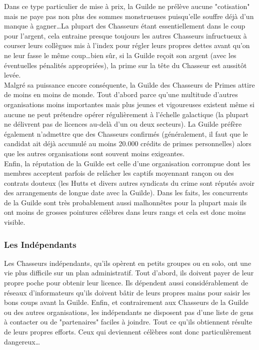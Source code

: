\documentclass[twoside]{article}
\begin{document}
Dans ce type particulier de mise à prix, la Guilde ne prélève aucune "cotisation" mais ne paye pas non plus des sommes monstrueuses puisqu'elle souffre déjà d'un manque à gagner\ldots La plupart des Chasseurs étant essentiellement dans le coup pour l'argent, cela entraine presque toujours les autres Chasseurs infructueux à courser leurs collègues mis à l'index pour régler leurs propres dettes avant qu'on ne leur fasse le même coup\ldots bien sûr, si la Guilde reçoit son argent (avec les éventuelles pénalités appropriées), la prime sur la tête du Chasseur est aussitôt levée.\\

Malgré sa puissance encore conséquente, la Guilde des Chasseurs de Primes attire de moins en moins de monde. Tout d'abord parce qu'une multitude d'autres organisations moins importantes mais plus jeunes et vigoureuses existent même si aucune ne peut prétendre opérer régulièrement à l'échelle galactique (la plupart ne délivrent pas de licences au-delà d'un ou deux secteurs). La Guilde préfère également n'admettre que des Chasseurs confirmés (généralement, il faut que le candidat ait déjà accumulé au moins 20.000 crédits de primes personnelles) alors que les autres organisations sont souvent moins exigeantes.\\

Enfin, la réputation de la Guilde est celle d'une organisation corrompue dont les membres acceptent parfois de relâcher les captifs moyennant rançon ou des contrats douteux (les Hutts et divers autres syndicats du crime sont réputés avoir des arrangements de longue date avec la Guilde). Dans les faits, les concurrents de la Guilde sont très probablement aussi malhonnêtes pour la plupart mais ils ont moins de grosses pointures célèbres dans leurs rangs et cela est donc moins visible.

\subsubsection{Les Indépendants}
Les Chasseurs indépendants, qu'ils opèrent en petits groupes ou en solo, ont une vie plus difficile sur un plan administratif. Tout d'abord, ils doivent payer de leur propre poche pour obtenir leur licence. Ils dépendent aussi considérablement de réseaux d'informateurs qu'ils doivent bâtir de leurs propres mains pour saisir les bons coups avant la Guilde. Enfin, et contrairement aux Chasseurs de la Guilde ou des autres organisations, les indépendants ne disposent pas d'une liste de gens à contacter ou de "partenaires" faciles à joindre. Tout ce qu'ils obtiennent résulte de leurs propres efforts. Ceux qui deviennent célèbres sont donc particulièrement dangereux\ldots
\end{document}

